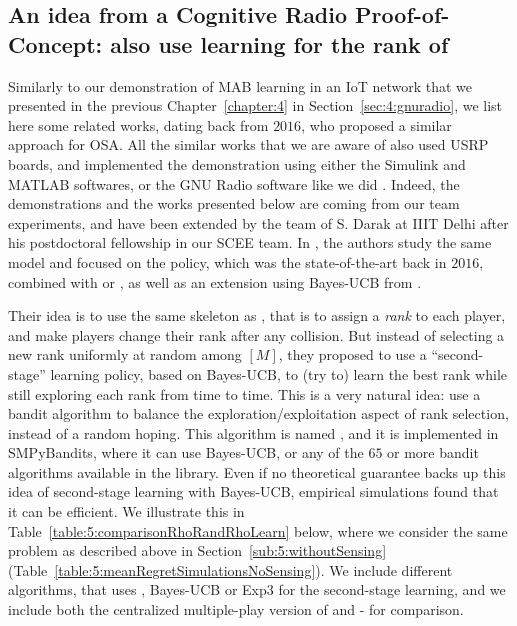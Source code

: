 \subsection{An idea from a Cognitive Radio Proof-of-Concept: also use learning for the rank of \RhoRand}
\label{sub:5:USRPdemos}

Similarly to our demonstration of MAB learning in an IoT network that we presented in the previous Chapter~\ref{chapter:4} in Section~\ref{sec:4:gnuradio},
we list here some related works, dating back from $2016$, who proposed a similar approach for OSA.
All the similar works that we are aware of also used USRP boards, and implemented the demonstration using either the Simulink and MATLAB softwares, or the GNU Radio software like we did \cite{Besson2018ICT}.
%
Indeed, the demonstrations and the works presented below are coming from our team experiments, and have been extended by the team of S. Darak at IIIT Delhi after his postdoctoral fellowship in our SCEE team.
%
In \cite{darak2016bayesian,Darak16}, the authors study the same model and focused on the \RhoRand{} policy, which was the state-of-the-art back in $2016$, combined with \UCB{} or \klUCB, as well as an extension using Bayes-UCB from \cite{Kaufmann12BUCB}.

Their idea is to use the same skeleton as \RhoRand{} \cite{darak2016bayesian}, that is to assign a \emph{rank} to each player, and make players change their rank after any collision. But instead of selecting a new rank uniformly at random among $[M]$, they proposed to use a ``second-stage'' learning policy, based on Bayes-UCB, to (try to) learn the best rank while still exploring each rank from time to time.
This is a very natural idea: use a bandit algorithm to balance the exploration/exploitation aspect of rank selection, instead of a random hoping.
This algorithm is named \rhoLearn, and it is implemented in SMPyBandits,
where it can use Bayes-UCB, or any of the $65$ or more bandit algorithms available in the library.
%
Even if no theoretical guarantee backs up this idea of second-stage learning with Bayes-UCB, empirical simulations found that it can be efficient.
We illustrate this in Table~\ref{table:5:comparisonRhoRandRhoLearn} below, where we consider the same problem as described above in Section~\ref{sub:5:withoutSensing} (Table~\ref{table:5:meanRegretSimulationsNoSensing}).
We include different \rhoLearn{} algorithms, that uses \klUCB{}, Bayes-UCB or Exp3 for the second-stage learning,
and we include both the centralized multiple-play version of \klUCB{} and \MCTopM-\klUCB{} for comparison.


